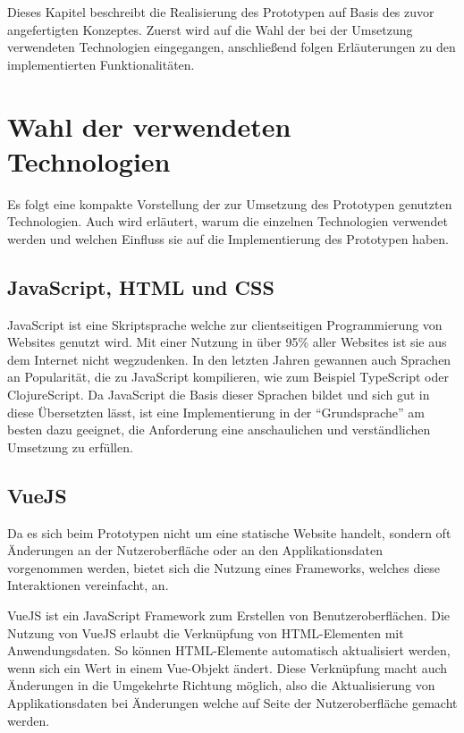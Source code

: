\documentclass[a4paper, 12pt]{scrreprt}
\begin{document}
Dieses Kapitel beschreibt die Realisierung des Prototypen auf Basis des zuvor angefertigten Konzeptes. Zuerst wird auf die Wahl der bei der Umsetzung verwendeten Technologien eingegangen, anschließend folgen Erläuterungen zu den implementierten Funktionalitäten.

\section{Wahl der verwendeten Technologien}
\label{sec:Technologien}
Es folgt eine kompakte Vorstellung der zur Umsetzung des Prototypen genutzten Technologien. Auch wird erläutert, warum die einzelnen Technologien verwendet werden und welchen Einfluss sie auf die Implementierung des Prototypen haben.

\subsection{JavaScript, HTML und CSS}
JavaScript ist eine Skriptsprache welche zur clientseitigen Programmierung von Websites genutzt wird. Mit einer Nutzung in über 95\% \autocite{OnlineJavascriptDistr} aller Websites ist sie aus dem Internet nicht wegzudenken. In den letzten Jahren gewannen auch Sprachen an Popularität, die zu JavaScript kompilieren, wie zum Beispiel TypeScript oder ClojureScript. Da JavaScript die Basis dieser Sprachen bildet und sich gut in diese Übersetzten lässt, ist eine Implementierung in der \enquote{Grundsprache} am besten dazu geeignet, die Anforderung eine anschaulichen und verständlichen Umsetzung zu erfüllen.
\subsection{VueJS}
\label{sec:vue}
Da es sich beim Prototypen nicht um eine statische Website handelt, sondern oft Änderungen an der Nutzeroberfläche oder an den Applikationsdaten vorgenommen werden, bietet sich die Nutzung eines Frameworks, welches diese Interaktionen vereinfacht, an. 

VueJS ist ein JavaScript Framework zum Erstellen von Benutzeroberflächen. Die Nutzung von VueJS erlaubt die Verknüpfung von HTML-Elementen mit Anwendungsdaten. So können HTML-Elemente automatisch aktualisiert werden, wenn sich ein Wert in einem Vue-Objekt ändert. Diese Verknüpfung macht auch Änderungen in die Umgekehrte Richtung möglich, also die Aktualisierung von Applikationsdaten bei Änderungen welche auf Seite der Nutzeroberfläche gemacht werden.
\end{document}
